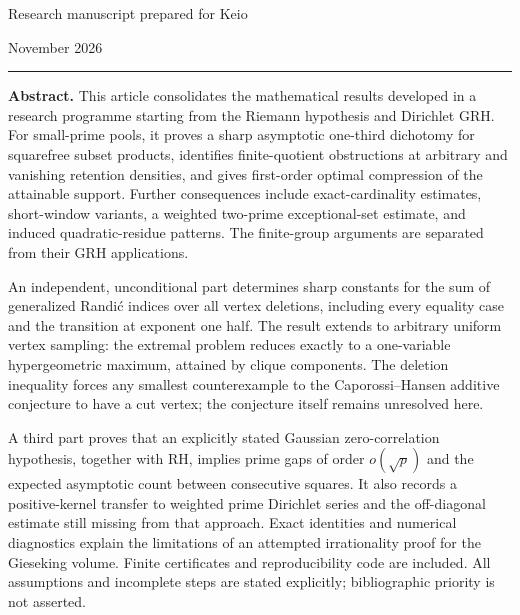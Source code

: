 \documentclass[11pt,a4paper]{article}
\theoremstyle{definition}
\theoremstyle{remark}
\begin{document}
\begin{titlepage}
\thispagestyle{empty}
\vspace{14pt}

\vspace{10pt}
\vspace{13pt}

\noindent Research manuscript prepared for Keio\par
{} November 2026
\vspace{12pt}\hrule\vspace{12pt}

\noindent\textbf{Abstract.}
This article consolidates the mathematical results developed in a research
programme starting from the Riemann hypothesis and Dirichlet GRH. For
small-prime pools, it proves a sharp asymptotic one-third dichotomy for
squarefree subset products, identifies finite-quotient obstructions at
arbitrary and vanishing retention densities, and gives first-order
optimal compression of the attainable support. Further consequences
include exact-cardinality estimates, short-window variants, a weighted
two-prime exceptional-set estimate, and induced quadratic-residue patterns.
The finite-group arguments are separated from their GRH applications.

An independent, unconditional part determines sharp constants for the sum
of generalized Randić indices over all vertex deletions, including every
equality case and the transition at exponent one half. The result extends
to arbitrary uniform vertex sampling: the extremal problem reduces exactly
to a one-variable hypergeometric maximum, attained by clique components.
The deletion inequality forces any smallest counterexample to the
Caporossi--Hansen additive conjecture to have a cut vertex; the conjecture
itself remains unresolved here.

A third part proves that an explicitly stated Gaussian zero-correlation
hypothesis, together with RH, implies prime gaps of order
$o(\sqrt p)$ and the expected asymptotic count between consecutive squares.
It also records a positive-kernel transfer to weighted prime Dirichlet series
and the off-diagonal estimate still missing from that approach. Exact
identities and numerical diagnostics explain the limitations of an attempted
irrationality proof for the Gieseking volume. Finite certificates and
reproducibility code are included. All assumptions and incomplete steps
are stated explicitly; bibliographic priority is not asserted.
\vfill
{}
\end{titlepage}
\end{document}
